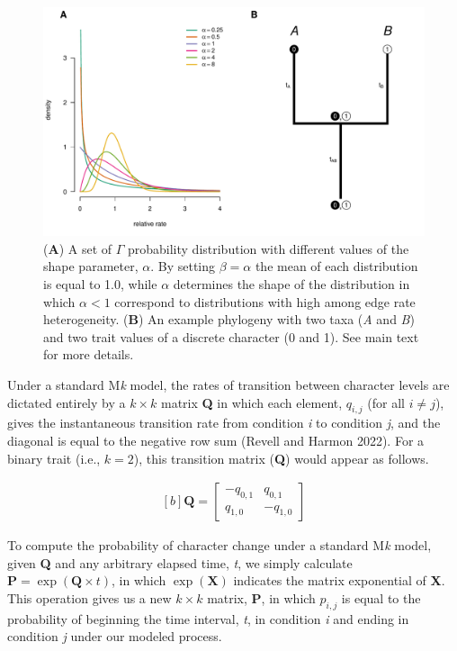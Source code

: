 \documentclass[fleqn,10pt,lineno]{wlpeerj} %
\begin{document}
\begin{figure}
\includegraphics[width=1\linewidth]{Revell-and-Harmon.fitgammaMk.PeerJ_files/figure-latex/unnamed-chunk-2-1} \caption{(\textbf{A}) A set of $\Gamma$ probability distribution with different values of the shape parameter, $\alpha$. By setting $\beta = \alpha$ the mean of each distribution is equal to 1.0, while $\alpha$ determines the shape of the distribution in which $\alpha < 1$ correspond to distributions with high among edge rate heterogeneity. (\textbf{B}) An example phylogeny with two taxa (\emph{A} and \emph{B}) and two trait values of a discrete character (0 and 1). See main text for more details.}\label{fig:unnamed-chunk-2}
\end{figure}

Under a standard M\emph{k} model, the rates of transition between character levels are dictated entirely by a \(k \times k\) matrix \textbf{Q} in which each element, \(q_{i,j}\) (for all \(i \neq j\)), gives the instantaneous transition rate from condition \emph{i} to condition \emph{j}, and the diagonal is equal to the negative row sum (Revell and Harmon 2022). For a binary trait (i.e., \(k = 2\)), this transition matrix (\textbf{Q}) would appear as follows.

\begin{equation}
\begin{aligned}[b]
\mathbf{Q} = \begin{bmatrix} -q_{0,1} & q_{0,1} \\ q_{1,0} & -q_{1,0} \end{bmatrix}
\end{aligned}
\end{equation}

To compute the probability of character change under a standard M\emph{k} model, given \textbf{Q} and any arbitrary elapsed time, \emph{t}, we simply calculate \(\mathbf{P} = \exp(\mathbf{Q} \times t)\), in which \(\exp(\mathbf{X})\) indicates the matrix exponential of \textbf{X}. This operation gives us a new \(k \times k\) matrix, \textbf{P}, in which \(p_{i,j}\) is equal to the probability of beginning the time interval, \emph{t}, in condition \emph{i} and ending in condition \emph{j} under our modeled process.
\end{document}
